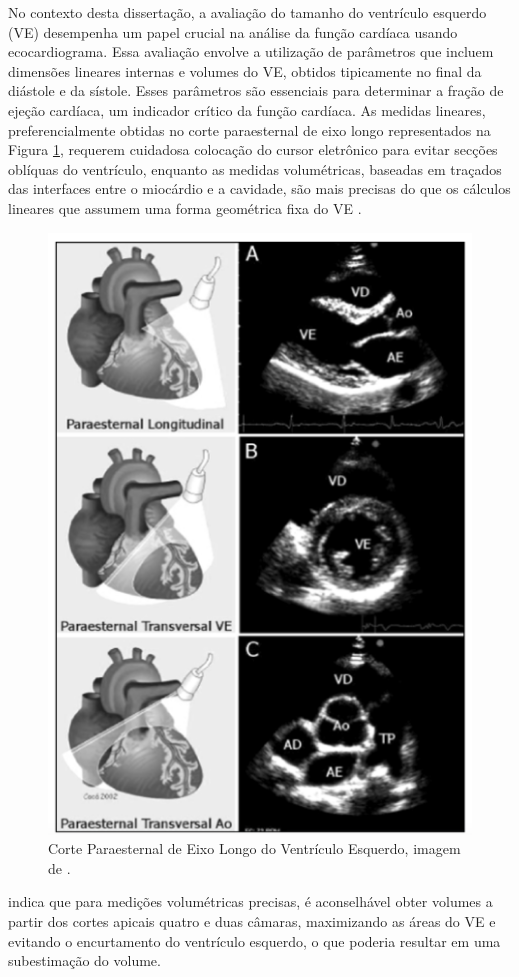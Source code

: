 No contexto desta dissertação, a avaliação do tamanho do ventrículo esquerdo (VE) desempenha um papel crucial na análise da função cardíaca usando ecocardiograma. Essa avaliação envolve a utilização de parâmetros que incluem dimensões lineares internas e volumes do VE, obtidos tipicamente no final da diástole e da sístole. 
Esses parâmetros são essenciais para determinar a fração de ejeção cardíaca, um indicador crítico da função cardíaca. As medidas lineares, preferencialmente obtidas no corte paraesternal de eixo longo representados na Figura \ref{fig:parasternal}, requerem cuidadosa colocação do cursor eletrônico para evitar secções oblíquas do ventrículo, enquanto as medidas volumétricas, baseadas em traçados das interfaces entre o miocárdio e a cavidade, são mais precisas do que os cálculos lineares que assumem uma forma geométrica fixa do VE \cite{Lang2015}. 

\begin{figure}[H]
\centering
\includegraphics[width=0.6\linewidth]{capitulos/figuras/paraesternalC.png}
\caption{Corte Paraesternal de Eixo Longo do Ventrículo Esquerdo, imagem de \textcite{Silva2004}.}
\label{fig:parasternal}
\end{figure}

\textcite{Lang2015} indica que para medições volumétricas precisas, é aconselhável obter volumes a partir dos cortes apicais quatro e duas câmaras, maximizando as áreas do VE e evitando o encurtamento do ventrículo esquerdo, o que poderia resultar em uma subestimação do volume.

